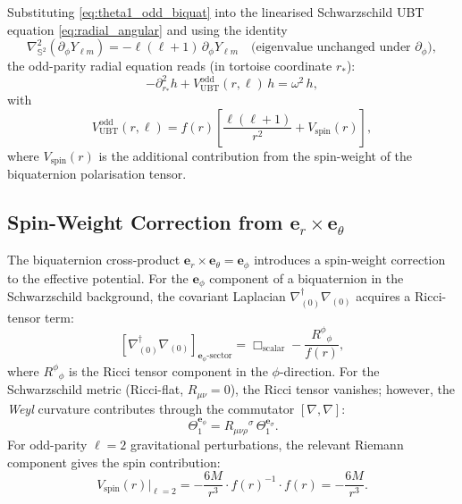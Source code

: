 \documentclass[12pt]{article}
\theoremstyle{definition}
\theoremstyle{remark}
\begin{document}
Substituting \eqref{eq:theta1_odd_biquat} into the linearised
Schwarzschild UBT equation \eqref{eq:radial_angular} and using the
identity
\begin{equation}
  \nabla_{\mathbb{S}^2}^2
  \!\left(\partial_\phi Y_{\ell m}\right)
  = -\ell(\ell+1)\,\partial_\phi Y_{\ell m}
  \quad \text{(eigenvalue unchanged under } \partial_\phi\text{)},
\end{equation}
the odd-parity radial equation reads (in tortoise coordinate $r_*$):
\begin{equation}
  \label{eq:odd_parity_eq}
  -\partial_{r_*}^2 h + V_{\text{UBT}}^{\text{odd}}(r,\ell)\,h = \omega^2\,h,
\end{equation}
with
\begin{equation}
  \label{eq:Vodd_ubt}
  V_{\text{UBT}}^{\text{odd}}(r, \ell)
  = f(r)\left[
      \frac{\ell(\ell+1)}{r^2}
      + V_{\text{spin}}(r)
    \right],
\end{equation}
where $V_{\text{spin}}(r)$ is the additional contribution from the
spin-weight of the biquaternion polarisation tensor.

\subsection{Spin-Weight Correction from $\boldsymbol{e}_r \times \boldsymbol{e}_\theta$}

The biquaternion cross-product $\boldsymbol{e}_r \times \boldsymbol{e}_\theta
= \boldsymbol{e}_\phi$ introduces a spin-weight correction to the
effective potential.  For the $\boldsymbol{e}_\phi$ component of a
biquaternion in the Schwarzschild background, the covariant Laplacian
$\nabla^\dagger_{(0)}\nabla_{(0)}$ acquires a Ricci-tensor term:
\begin{equation}
  \left[\nabla^\dagger_{(0)}\nabla_{(0)}\right]_{\boldsymbol{e}_\phi\text{-sector}}
  = \Box_{\text{scalar}} - \frac{R^\phi{}_\phi}{f(r)},
  \label{eq:curved_spin_laplacian}
\end{equation}
where $R^\phi{}_\phi$ is the Ricci tensor component in the $\phi$-direction.
For the Schwarzschild metric (Ricci-flat, $R_{\mu\nu} = 0$), the Ricci
tensor vanishes; however, the \emph{Weyl} curvature contributes through
the commutator $[\nabla, \nabla]$:
\begin{equation}
  [\nabla_\mu, \nabla_\nu]\,\Theta_1^{\boldsymbol{e}_\phi}
  = R_{\mu\nu\rho}{}^\sigma\,\Theta_1^{\boldsymbol{e}_\sigma}.
  \label{eq:riemann_commutator}
\end{equation}
For odd-parity $\ell=2$ gravitational perturbations, the relevant
Riemann component gives the spin contribution:
\begin{equation}
  V_{\text{spin}}(r)\Big|_{\ell=2}
  = -\frac{6M}{r^3} \cdot f(r)^{-1} \cdot f(r)
  = -\frac{6M}{r^3}.
  \label{eq:Vspin_value}
\end{equation}
\end{document}
